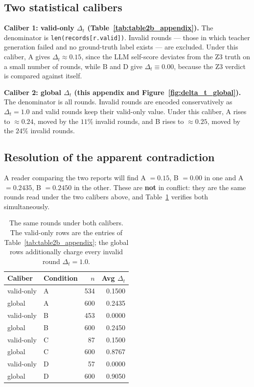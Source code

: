 \documentclass{article}
\begin{document}
\subsection{Two statistical calibers}
\label{sec:calibers}

\textbf{Caliber 1: valid-only $\Delta_t$ (Table~\ref{tab:table2b_appendix}).} The denominator is
\texttt{len(records[r.valid])}. Invalid rounds --- those in which teacher generation failed and no
ground-truth label exists --- are excluded. Under this caliber, A gives $\Delta_t \approx 0.15$, since
the LLM self-score deviates from the Z3 truth on a small number of rounds, while B and D give
$\Delta_t \equiv 0.00$, because the Z3 verdict is compared against itself.

\textbf{Caliber 2: global $\Delta_t$ (this appendix and Figure~\ref{fig:delta_t_global}).} The
denominator is all rounds. Invalid rounds are encoded conservatively as $\Delta_t = 1.0$ and valid
rounds keep their valid-only value. Under this caliber, A rises to $\approx 0.24$, moved by the $11\%$
invalid rounds, and B rises to $\approx 0.25$, moved by the $24\%$ invalid rounds.

\subsection{Resolution of the apparent contradiction}

A reader comparing the two reports will find A $= 0.15$, B $= 0.00$ in one and A $= 0.2435$,
B $= 0.2450$ in the other. These are \textbf{not} in conflict: they are the same rounds read under
the two calibers above, and Table~\ref{tab:table2c_calibers} verifies both simultaneously.

\begin{table}[t]
  \centering
  \caption{The same rounds under both calibers. The valid-only rows are the entries of
  Table~\ref{tab:table2b_appendix}; the global rows additionally charge every invalid round $\Delta_t = 1.0$.}
  \label{tab:table2c_calibers}
  \small
  \begin{tabular}{@{}llrr@{}}
    \toprule
    Caliber & Condition & $n$ & Avg $\Delta_t$ \\
    \midrule
    valid-only & A & 534 & 0.1500 \\
    global     & A & 600 & 0.2435 \\
    valid-only & B & 453 & 0.0000 \\
    global     & B & 600 & 0.2450 \\
    valid-only & C & 87  & 0.1500 \\
    global     & C & 600 & 0.8767 \\
    valid-only & D & 57  & 0.0000 \\
    global     & D & 600 & 0.9050 \\
    \bottomrule
  \end{tabular}
\end{table}
\end{document}
